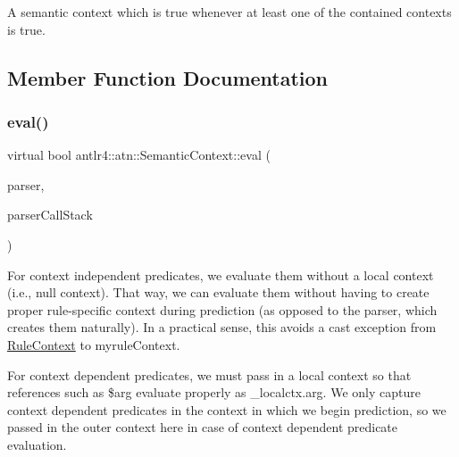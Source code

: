 A semantic context which is true whenever at least one of the contained contexts is true. 

\subsection{Member Function Documentation}
\mbox{\label{classantlr4_1_1atn_1_1SemanticContext_a77bcdcfae815a6497ed281445417f699}} 
\subsubsection{\texorpdfstring{eval()}{eval()}\hspace{0.1cm}{\footnotesize\ttfamily [1/3]}}
{\footnotesize\ttfamily virtual bool antlr4\+::atn\+::\+Semantic\+Context\+::eval (\begin{DoxyParamCaption}\item[{\hyperlink{classantlr4_1_1Recognizer}{Recognizer} $\ast$}]{parser,  }\item[{\hyperlink{classantlr4_1_1RuleContext}{Rule\+Context} $\ast$}]{parser\+Call\+Stack }\end{DoxyParamCaption})\hspace{0.3cm}{\ttfamily [pure virtual]}}



For context independent predicates, we evaluate them without a local context (i.\+e., null context). That way, we can evaluate them without having to create proper rule-\/specific context during prediction (as opposed to the parser, which creates them naturally). In a practical sense, this avoids a cast exception from \hyperlink{classantlr4_1_1RuleContext}{Rule\+Context} to myrule\+Context. 

For context dependent predicates, we must pass in a local context so that references such as \$arg evaluate properly as \+\_\+localctx.\+arg. We only capture context dependent predicates in the context in which we begin prediction, so we passed in the outer context here in case of context dependent predicate evaluation. 

\mbox{\label{classantlr4_1_1atn_1_1SemanticContext_aaf020c5b73a8d0216f8423acd5d4cea8}} 

